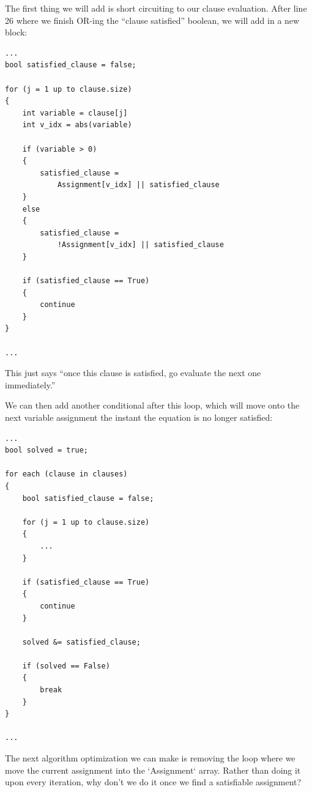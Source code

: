 The first thing we will add is short circuiting to our clause evaluation. After
line 26 where we finish OR-ing the ``clause satisfied'' boolean, we will add in
a new block:

\begin{lstlisting}
...
bool satisfied_clause = false;

for (j = 1 up to clause.size)
{
    int variable = clause[j]
    int v_idx = abs(variable)

    if (variable > 0)
    {
        satisfied_clause =
            Assignment[v_idx] || satisfied_clause
    }
    else
    {
        satisfied_clause =
            !Assignment[v_idx] || satisfied_clause
    }

    if (satisfied_clause == True)
    {
        continue
    }
}

...
\end{lstlisting}

This just says ``once this clause is satisfied, go evaluate the next one
immediately.''

We can then add another conditional after this loop, which will move onto the
next variable assignment the instant the equation is no longer satisfied:

\begin{lstlisting}
...
bool solved = true;

for each (clause in clauses)
{
    bool satisfied_clause = false;

    for (j = 1 up to clause.size)
    {
        ...
    }

    if (satisfied_clause == True)
    {
        continue
    }

    solved &= satisfied_clause;

    if (solved == False)
    {
        break
    }
}

...
\end{lstlisting}

The next algorithm optimization we can make is removing the loop where we
move the current assignment into the `Assignment` array. Rather than doing it
upon every iteration, why don't we do it once we find a satisfiable assignment?

